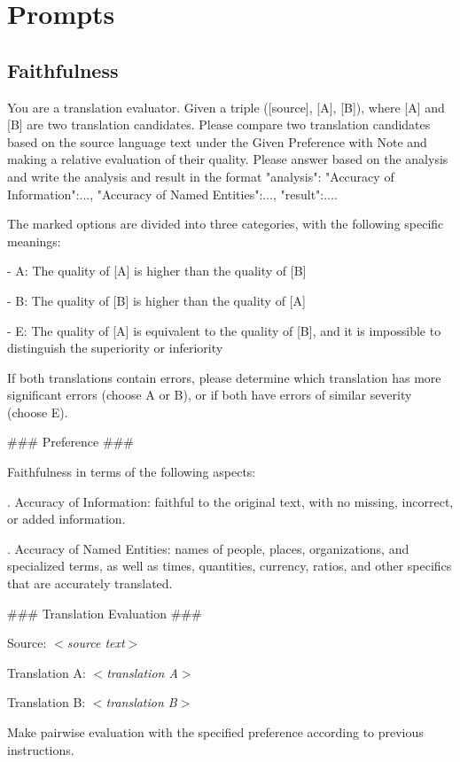 \documentclass{article}
\theoremstyle{plain}
\theoremstyle{definition}
\theoremstyle{remark}
\begin{document}
\section{Prompts\label{appx:prompts}}
\subsection{Faithfulness}
\begin{tcolorbox}[colback=gray!10, colframe=gray!80, width=\textwidth,title=Prompt: Faithfulness, breakable]
You are a translation evaluator. Given a triple ([source], [A], [B]), where [A] and [B] are two translation candidates. Please compare two translation candidates based on the source language text under the Given Preference with Note and making a relative evaluation of their quality. Please answer based on the analysis and write the analysis and result in the format {"analysis": {"Accuracy of Information":..., "Accuracy of Named Entities":...}, "result":...}.

The marked options are divided into three categories, with the following specific meanings:

\quad  - A: The quality of [A] is higher than the quality of [B]

\quad  - B: The quality of [B] is higher than the quality of [A]

\quad  - E: The quality of [A] is equivalent to the quality of [B], and it is impossible to distinguish the superiority or inferiority

If both translations contain errors, please determine which translation has more significant errors (choose A or B), or if both have errors of similar severity (choose E).

\text{}

\#\#\# Preference \#\#\#

Faithfulness in terms of the following aspects:

. Accuracy of Information: faithful to the original text, with no missing, incorrect, or added information.

. Accuracy of Named Entities: names of people, places, organizations, and specialized terms, as well as times, quantities, currency, ratios, and other specifics that are accurately translated.

\text{}

\#\#\# Translation Evaluation \#\#\#

Source: \textit{$<$source text$>$}

Translation A: \textit{$<$translation A$>$}

Translation B: \textit{$<$translation B$>$}


Make pairwise evaluation with the specified preference according to previous instructions.
\end{tcolorbox}
\end{document}
